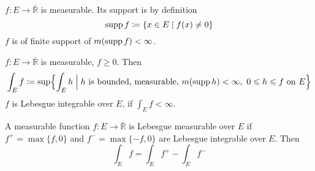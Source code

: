 \begin{definition*}
    $f : E \to \overline{\mathbb{R}}$ is measurable.
    Its support is by definition
    \[ \operatorname{supp} f \coloneqq \{ x \in E \mid f(x) \ne 0 \} \]
    $f$ is of finite support of $m(\operatorname{supp} f) < \infty$.
\end{definition*}
\begin{definition}
    $f : E \to \overline{\mathbb{R}}$ is measurable, $f \ge 0$. Then
    \[
        \int_E f \coloneqq \sup \Bigl\{
            \int_E h \mathrel{\Big\vert}
            \text{$h$ is bounded, measurable,}\
            m(\operatorname{supp} h) < \infty,\ 0 \leqslant h \leqslant f \text{ on } E
        \Bigr\} 
    \]
    $f$ is Lebesgue integrable over $E$, if $\int_E f < \infty$.
\end{definition}
\begin{definition}
    A measurable function $f : E \to \overline{\mathbb{R}}$
    is Lebesgue measurable over $E$ if 
    $f^+ = \max\{f, 0\}$ and $f^- = \max\{-f, 0\}$ are Lebesgue
    integrable over $E$.
    Then
    \[ \int_E f = \int_E f^+ - \int_E f^- \]
\end{definition}
